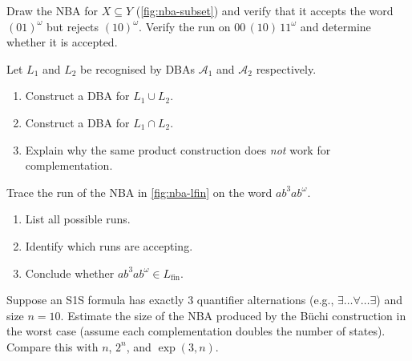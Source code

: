 \begin{chapex}
Draw the NBA for $X \subseteq Y$ (\cref{fig:nba-subset})
and verify that it accepts the word $(01)^\omega$ but rejects
$(10)^\omega$.  Verify the run on $00\,(10)\,11^\omega$ and
determine whether it is accepted.
\end{chapex}

\begin{chapex}
Let $L_1$ and $L_2$ be recognised by DBAs $\mathcal{A}_1$ and
$\mathcal{A}_2$ respectively.
\begin{enumerate}[nosep,label=(\alph*)]
  \item Construct a DBA for $L_1 \cup L_2$.
  \item Construct a DBA for $L_1 \cap L_2$.
  \item Explain why the same product construction does \emph{not}
        work for complementation.
\end{enumerate}
\end{chapex}

\begin{chapex}
Trace the run of the NBA in \cref{fig:nba-lfin} on the word
$a b^3 a b^\omega$.
\begin{enumerate}[nosep,label=(\alph*)]
  \item List all possible runs.
  \item Identify which runs are accepting.
  \item Conclude whether $ab^3 ab^\omega \in L_{\mathrm{fin}}$.
\end{enumerate}
\end{chapex}

\begin{chapex}
Suppose an S1S formula has exactly 3 quantifier alternations
(e.g., $\exists\ldots\forall\ldots\exists$) and size $n = 10$.
Estimate the size of the NBA produced by the B\"uchi construction
in the worst case (assume each complementation doubles the number
of states).  Compare this with $n$, $2^n$, and $\exp(3, n)$.
\end{chapex}
